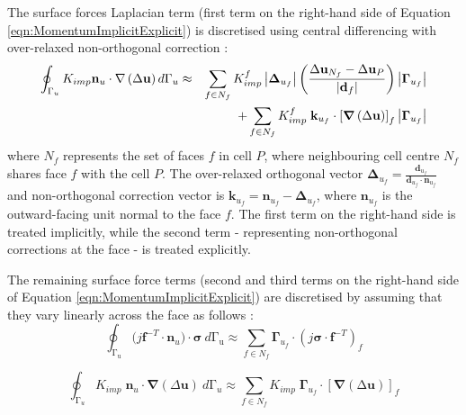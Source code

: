 \documentclass[sn-mathphys,Numbered,draft]{sn-jnl}%
\newcommand{\bb}{\boldsymbol}
\begin{document}
 The surface forces Laplacian term (first term on the right-hand side of Equation \ref{eqn:MomentumImplicitExplicit}) is discretised using central differencing with over-relaxed non-orthogonal correction \cite{demirdzic_finite_1993, jasak_application_2000, cardiff_development_2014, cardiff_large_2014, cardiff_lagrangian_2017}:
\begin{eqnarray} \label{eq:diffusion}
	\oint_{\mathrm{\Gamma}_u}
	K_{imp} \mathbf{n}_u\cdot\nabla\left(\Delta\mathbf{u}\right) d\mathrm{\Gamma}_u
	&\approx&
	\sum_{f \in N_f} K_{imp}^f \left|\boldsymbol{\Delta}_{u_f}\right|\left(\frac{\Delta \mathbf{u}_{N_f} - \Delta \mathbf{u}_P}{\left|\mathbf{d}_f\right|}\right)\left|\mathbf{\Gamma}_{u_f}\right| \notag \\
	    &&+ \sum_{f \in N_f} K_{imp}^f \; \mathbf{k}_{u_f} \cdot
	    \left[
	    \boldsymbol{\nabla} \left(\mathrm{\Delta}\mathbf{u}\right)
	    \right]_f
	    \left|\mathbf{\Gamma}_{u_f}\right|
\end{eqnarray}
where $N_f$ represents the set of faces $f$ in cell $P$, where neighbouring cell centre $N_f$ shares face $f$ with the cell $P$.
The over-relaxed orthogonal vector $\boldsymbol{\Delta}_{u_f} = \frac{\boldsymbol{d}_{u_f}}{\boldsymbol{d}_{u_f} \cdot \boldsymbol{n}_{u_f}}$ and non-orthogonal correction vector is $\boldsymbol{k}_{u_f}=\boldsymbol{n}_{u_f}-\boldsymbol{\Delta}_{u_f}$, where $\boldsymbol{n}_{u_f}$ is the outward-facing unit normal to the face $f$.
The first term on the right-hand side is treated implicitly, while the second term - representing non-orthogonal corrections at the face - is treated explicitly.

 The remaining surface force terms (second and third terms on the right-hand side of Equation \ref{eqn:MomentumImplicitExplicit}) are discretised by assuming that they vary linearly across the face as follows \cite{noauthor_openfoam_2015}:
\begin{equation}
	\oint_{\mathrm{\Gamma_u}}(j\mathbf{f}^{-T}\cdot{\mathbf{n}_u)\cdot\boldsymbol{\sigma}}\ d\mathrm{\Gamma_u}
	\approx 
	\sum_{f \in N_f} \mathbf{\Gamma}_{u_f} \cdot
	\left(j\boldsymbol{\sigma}\cdot\mathbf{f}^{-T}\right)_f
\end{equation}
	
\begin{equation} \label{eq:diffusion_exp}
	    \oint_{\mathrm{\Gamma}_u}{K_{imp} \; \mathbf{n}_u\cdot \bb{\nabla} \left(\Delta\mathbf{u}\right)}\ d\mathrm{\Gamma}_u
	\approx
	\sum_{f \in N_f} K_{imp} \; \mathbf{\Gamma}_{u_f} \cdot \left[\bb{\nabla}\left(\mathrm{\Delta}\mathbf{u}\right)\right]_f
\end{equation}
\end{document}
